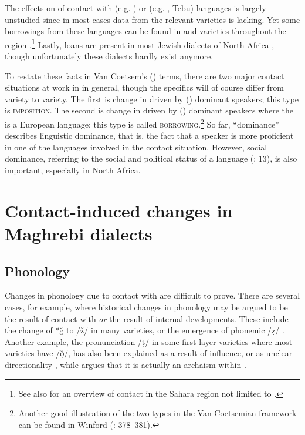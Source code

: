 \documentclass[output=paper]{langsci/langscibook}
\begin{document}
  The effects on   of contact with  (e.g. ) or  (e.g. , Tebu) languages is largely unstudied since in most cases data from the relevant  varieties is lacking. Yet some borrowings from these languages can be found in  and  varieties throughout the region \citep{Souag2013lexical}.\footnote{See also \citet{Souag2016sahara} for an overview of contact in the Sahara region not limited to .} Lastly,  loans are present in most Jewish  dialects of North Africa \citep{Yoda2013}, though unfortunately these dialects hardly exist anymore.

  \largerpage

  To restate these facts in Van Coetsem’s (\citeyear{VanCoetsem1988,VanCoetsem2000}) terms, there are two major contact situations at work in   in general, though the specifics will of course differ from variety to variety. The first is change in  driven by  () dominant speakers; this  type is \textsc{imposition}. The second is change in  driven by  () dominant speakers where the  is a European  language; this  type is called \textsc{borrowing}.\footnote{Another good illustration of the two  types in the Van Coetsemian framework can be found in Winford (\citeyear{Winford2005}: 378–381).} So far, ``dominance'' describes linguistic dominance, that is, the fact that a speaker is more proficient in one of the languages involved in the contact situation. However, social dominance, referring to the social and political status of a language (\citealt{VanCoetsem1988}: 13), is also important, especially in North Africa.

\section{ Contact-induced changes in Maghrebi dialects}

\subsection{ Phonology}

Changes in   phonology due to contact with  are difficult to prove. There are several cases, for example, where historical changes in  phonology may be argued to be the result of contact with  \textit{or} the result of internal developments. These include the change of *ǧ to /ž/ in many varieties, or the emergence of phonemic /ẓ/ \citep{Souag2016sahara}. Another example, the pronunciation /ṭ/ in some first-layer varieties where most  varieties have /ð̣/, has also been explained as a result of  influence, or as unclear directionality \citep[187]{Kossmann2013book}, while \citet{Al-Jallad2015Maghreb} argues that it is actually an archaism within .
\end{document}
